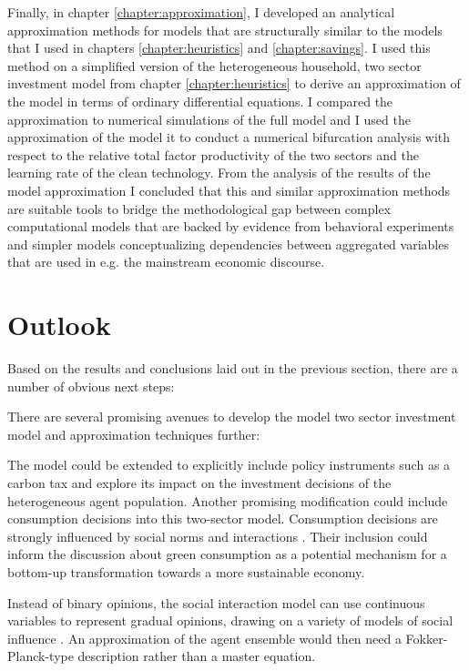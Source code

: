 Finally, in chapter \ref{chapter:approximation}, I developed an analytical approximation methods for models that are structurally similar to the models that I used in chapters \ref{chapter:heuristics} and \ref{chapter:savings}. I used this method on a simplified version of the heterogeneous household, two sector investment model from chapter \ref{chapter:heuristics} to derive an approximation of the model in terms of ordinary differential equations. I compared the approximation to numerical simulations of the full model and I used the approximation of the model it to conduct a numerical bifurcation analysis with respect to the relative total factor productivity of the two sectors and the learning rate of the clean technology. 
From the analysis of the results of the model approximation I concluded that this and similar approximation methods are suitable tools to bridge the methodological gap between complex computational models that are backed by evidence from behavioral experiments and simpler models conceptualizing dependencies between aggregated variables that are used in e.g. the mainstream economic discourse.

\section{Outlook}
Based on the results and conclusions laid out in the previous section, there are a number of obvious next steps:

There are several promising avenues to develop the model two sector investment model and approximation techniques further: 

The model could be extended to explicitly include policy instruments such as a carbon tax and explore its impact on the investment decisions of the heterogeneous agent population. Another promising modification could include consumption decisions into this two-sector model. Consumption decisions are strongly influenced by social norms and interactions \citep{Peattie2010}. Their inclusion could inform the discussion about green consumption as a potential mechanism for a bottom-up transformation towards a more sustainable economy.


Instead of binary opinions, the social interaction model can use continuous variables to represent gradual opinions, drawing on a variety of models of social influence \citep[see ref.][pp. 988 f.]{Mueller-Hansen2017}. An approximation of the agent ensemble would then need a Fokker-Planck-type description rather than a master equation.

